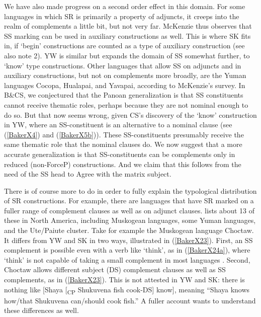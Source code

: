 \documentclass[output=paper]{langscibook}
\begin{document}
We have also made progress on a second order effect in this domain. For some languages in which SR is primarily a property of adjuncts, it creeps into the realm of complements a little bit, but not very far. McKenzie thus observes that SS marking can be used in auxiliary constructions as well. This is where SK fits in, if ‘begin’ constructions are counted as a type of auxiliary construction (see also note 2). YW is similar but expands the domain of SS somewhat further, to ‘know’ type constructions. Other languages that allow SS on adjuncts and in auxiliary constructions, but not on complements more broadly, are the Yuman languages Cocopa, Hualapai, and Yavapai, according to McKenzie’s survey. In B\&CS, we conjectured that the Panoan generalization is that SS constituents cannot receive thematic roles, perhaps because they are not nominal enough to do so. But that now seems wrong, given CS’s discovery of the ‘know’ construction in YW, where an SS-constituent is an alternative to a nominal clause (see (\ref{BakerX4}) and (\ref{BakerX5b})). These SS-constituents presumably receive the same thematic role that the nominal clauses do. We now suggest that a more accurate generalization is that SS-constituents can be complements only in reduced (non-ForceP) constructions. And we claim that this follows from the need of the SS head to Agree with the matrix subject.

There is of course more to do in order to fully explain the typological distribution of SR constructions. For example, there are languages that have SR marked on a fuller range of complement clauses as well as on adjunct clauses. \citet{mckenzie2015survey} lists about 13 of these in North America, including Muskogean languages, some Yuman languages, and the Ute/Paiute cluster. Take for example the Muskogean language Choctaw. It differs from YW and SK in two ways, illustrated in (\ref{BakerX23}). First, an SS complement is possible even with a verb like ‘think’, as in (\ref{BakerX24a}), where ‘think’ is not capable of taking a small complement in most languages \citep{wurmbrand2001infinitives}. Second, Choctaw allows different subject (DS) complement clauses as well as SS complements, as in (\ref{BakerX23}). This is not attested in YW and SK: there is nothing like [Shaya [\textsubscript{CP} Shukuvena fish cook-DS] know], meaning “Shaya knows how/that Shukuvena can/should cook fish.” A fuller account wants to understand these differences as well.
\end{document}
